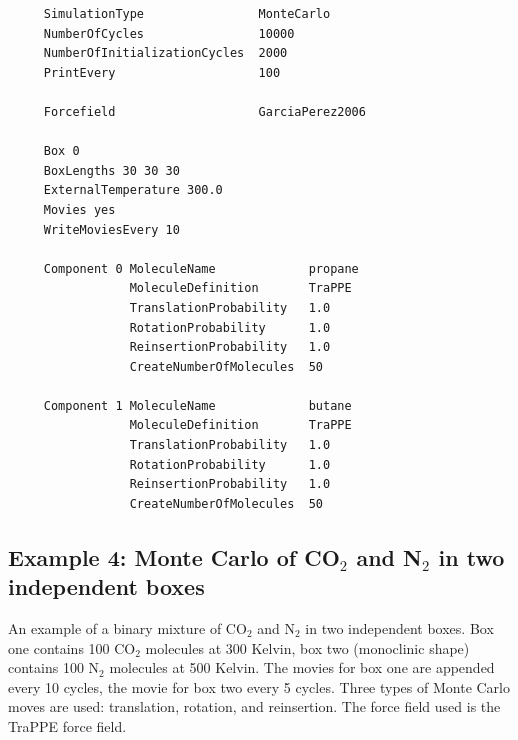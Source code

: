 \begin{tiny}
\begin{verbatim}
     SimulationType                MonteCarlo
     NumberOfCycles                10000
     NumberOfInitializationCycles  2000
     PrintEvery                    100
     
     Forcefield                    GarciaPerez2006
     
     Box 0
     BoxLengths 30 30 30
     ExternalTemperature 300.0
     Movies yes
     WriteMoviesEvery 10
     
     Component 0 MoleculeName             propane
                 MoleculeDefinition       TraPPE
                 TranslationProbability   1.0
                 RotationProbability      1.0
                 ReinsertionProbability   1.0
                 CreateNumberOfMolecules  50
     
     Component 1 MoleculeName             butane
                 MoleculeDefinition       TraPPE
                 TranslationProbability   1.0
                 RotationProbability      1.0
                 ReinsertionProbability   1.0
                 CreateNumberOfMolecules  50
\end{verbatim}
\end{tiny}

\subsection*{Example 4: Monte Carlo of CO$_2$ and N$_2$ in two independent boxes}
An example of a binary mixture of CO$_2$ and N$_2$ in two independent boxes. Box one contains 100 CO$_2$ molecules
at 300 Kelvin, box two (monoclinic shape) contains 100 N$_2$ molecules at 500 Kelvin. The movies for box one are appended
every 10 cycles, the movie for box two every 5 cycles. Three types of Monte Carlo moves are used: translation, rotation, and
reinsertion. The force field used is the TraPPE force field.

